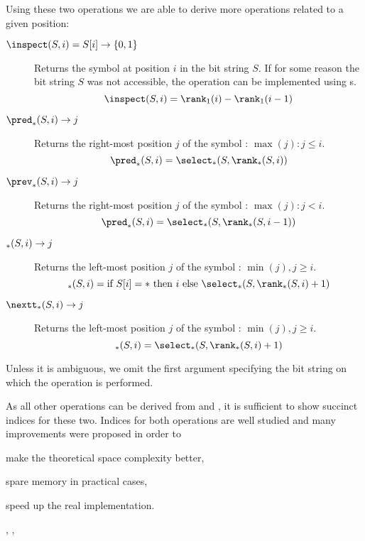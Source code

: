 Using these two operations we are able to derive more operations related to a given position:
\begin{description}
	\item[$\inspect(S, i) = S[i\char93 \rightarrow \{0, 1\}$]
	Returns the symbol at position $i$ in the bit string $S$.
	If for some reason the bit string $S$ was not accessible, the operation can be implemented using \rank{}s.
	$$ \inspect(S, i) = \rank_1(i) - \rank_1(i - 1) $$

	\item[$\pred_{\ph}(S, i) \rightarrow j$]
	Returns the right-most position $j$ of the symbol \ph{}: $\max(j) : j \le i$.
	$$ \pred_{\ph}(S, i) = \select_{\ph}(S, \rank_{\ph}(S, i)) $$
	
	\item[$\prev_{\ph}(S, i) \rightarrow j$]
	Returns the right-most position $j$ of the symbol \ph{}: $\max(j) : j < i$.
	$$ \pred_{\ph}(S, i) = \select_{\ph}(S, \rank_{\ph}(S, i - 1)) $$

	\item[$\succ_{\ph}(S, i) \rightarrow j$]
	Returns the left-most position $j$ of the symbol \ph{}: $\min(j), j \ge i$.
	$$ \succ_{\ph}(S, i) = \textrm{if}\ S[i] = \ph\ \textrm{then}\ i \ \textrm{else}\ \select_{\ph}(S, \rank_{\ph}(S, i) + 1) $$

	\item[$\nextt_{\ph}(S, i) \rightarrow j$]
	Returns the left-most position $j$ of the symbol \ph{}: $\min(j), j \ge i$.
	$$ \succ_{\ph}(S, i) = \select_{\ph}(S, \rank_{\ph}(S, i) + 1) $$
\end{description}

Unless it is ambiguous, we omit the first argument specifying the bit string on which the operation is performed.

\bigbreak

As all other operations can be derived from \rank{} and \select{}, it is sufficient to show succinct indices for these two.
Indices for both operations are well studied and many improvements were proposed in order to
\begin{iteminline}
	\item make the theoretical space complexity better,
	\item spare memory in practical cases,
	\item speed up the real implementation.
\end{iteminline}
\cite{gonzalez2005practical}, \cite{kim2005efficient}, \cite{makinen2007rank}

